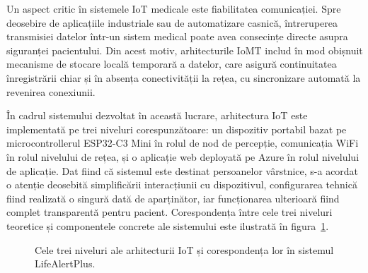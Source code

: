 ﻿\documentclass[12pt,a4paper,twoside]{article}
\begin{document}
Un aspect critic în sistemele IoT medicale este fiabilitatea comunicației. Spre deosebire de aplicațiile industriale sau de automatizare casnică, întreruperea transmisiei datelor într-un sistem medical poate avea consecințe directe asupra siguranței pacientului. Din acest motiv, arhitecturile IoMT includ în mod obișnuit mecanisme de stocare locală temporară a datelor, care asigură continuitatea înregistrării chiar și în absența conectivității la rețea, cu sincronizare automată la revenirea conexiunii.

În cadrul sistemului dezvoltat în această lucrare, arhitectura IoT este implementată pe trei niveluri corespunzătoare: un dispozitiv portabil bazat pe microcontrollerul ESP32-C3 Mini în rolul de nod de percepție, comunicația WiFi în rolul nivelului de rețea, și o aplicație web deployată pe Azure în rolul nivelului de aplicație. Dat fiind că sistemul este destinat persoanelor vârstnice, s-a acordat o atenție deosebită simplificării interacțiunii cu dispozitivul, configurarea tehnică fiind realizată o singură dată de aparținător, iar funcționarea ulterioară fiind complet transparentă pentru pacient. Corespondența între cele trei niveluri teoretice și componentele concrete ale sistemului este ilustrată în figura~\ref{fig:iot-layers}.

\begin{figure}[H]
\centering
{}
\caption{Cele trei niveluri ale arhitecturii IoT și corespondența lor în sistemul LifeAlertPlus.}
\label{fig:iot-layers}
\end{figure}
\end{document}
